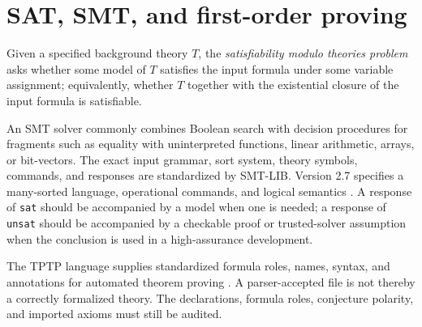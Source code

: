 \section{SAT, SMT, and first-order proving}
\label{sec:automated-reasoning-06}

\begin{definition}
Given a specified background theory \(T\), the \emph{satisfiability
modulo theories problem} asks whether some model of \(T\) satisfies the
input formula under some variable assignment; equivalently, whether
\(T\) together with the existential closure of the input formula is
satisfiable.
\end{definition}

An SMT solver commonly combines Boolean search with decision procedures for
fragments such as equality with uninterpreted functions, linear arithmetic,
arrays, or bit-vectors.  The exact input grammar, sort system, theory symbols,
commands, and responses are standardized by SMT-LIB.  Version 2.7 specifies a
many-sorted language, operational commands, and logical semantics
\cite{SMTLIB2025}.  A response of \texttt{sat} should be accompanied by a model
when one is needed; a response of \texttt{unsat} should be accompanied by a
checkable proof or trusted-solver assumption when the conclusion is used in a
high-assurance development.

The TPTP language supplies standardized formula roles, names, syntax, and
annotations for automated theorem proving \cite{TPTP}.  A parser-accepted file
is not thereby a correctly formalized theory.  The declarations, formula
roles, conjecture polarity, and imported axioms must still be audited.

